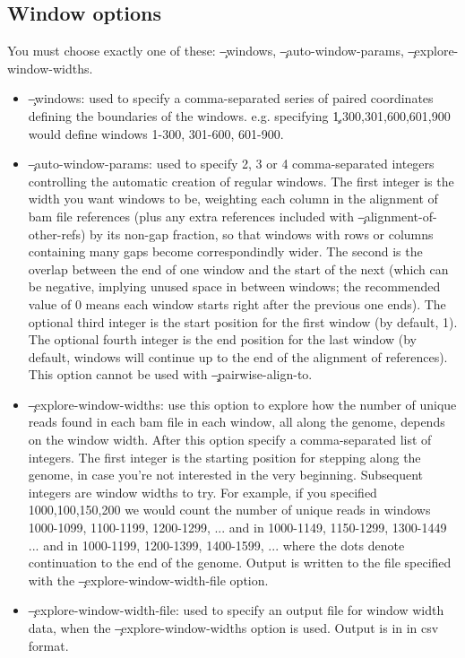 \subsection{Window options}
You must choose exactly one of these: \c{--windows}, \c{--auto-window-params}, \c{--explore-window-widths}.
\begin{itemize}
\item \c{--windows}: used to specify a comma-separated series of paired coordinates defining the boundaries of the windows.
e.g. specifying \c{1,300,301,600,601,900} would define windows 1-300, 301-600, 601-900.
\item \c{--auto-window-params}: used to specify 2, 3 or 4 comma-separated integers controlling the automatic creation of regular windows.
The first integer is the width you want windows to be, weighting each column in the alignment of bam file references (plus any extra references included with \c{--alignment-of-other-refs}) by its non-gap fraction, so that windows with rows or columns containing many gaps become correspondindly wider.
The second is the overlap between the end of one window and the start of the next (which can be negative, implying unused space in between windows; the recommended value of 0 means each window starts right after the previous one ends).
The optional third integer is the start position for the first window (by default, 1).
The optional fourth integer is the end position for the last window (by default, windows will continue up to the end of the alignment of references).
This option cannot be used with \c{--pairwise-align-to}.
\item \c{--explore-window-widths}: use this option to explore how the number of unique reads found in each bam file in each window, all along the genome, depends on the window width.
After this option specify a comma-separated list of integers.
The first integer is the starting position for stepping along the genome, in case you're not interested in the very beginning.
Subsequent integers are window widths to try.
For example, if you specified 1000,100,150,200 we would count the number of unique reads in windows 1000-1099, 1100-1199, 1200-1299, ... and in 1000-1149, 1150-1299, 1300-1449 ... and in 1000-1199, 1200-1399, 1400-1599, ... where the dots denote continuation to the end of the genome.
Output is written to the file specified with the \c{--explore-window-width-file} option.
\item \c{--explore-window-width-file}: used to specify an output file for window width data, when the \c{--explore-window-widths} option is used.
Output is in in csv format.
\end{itemize}

